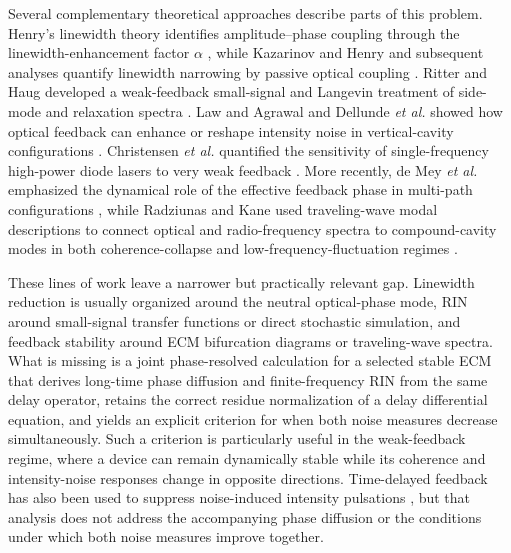 \documentclass{optica-article}
\newif\ifmarked
\newcommand{\rev}[1]{\ifmarked{\color{blue}#1}\else#1\fi}
\begin{document}
Several complementary theoretical approaches describe parts of this problem. Henry's linewidth theory identifies amplitude--phase coupling through the linewidth-enhancement factor $\alpha$ \cite{Henry1982}, while Kazarinov and Henry and subsequent analyses quantify linewidth narrowing by passive optical coupling \cite{KazarinovHenry1987,Tromborg1991,Wenzel2021}. Ritter and Haug developed a weak-feedback small-signal and Langevin treatment of side-mode and relaxation spectra \cite{RitterHaug1993}. Law and Agrawal and Dellunde \emph{et al.} showed how optical feedback can enhance or reshape intensity noise in vertical-cavity configurations \cite{LawAgrawal1998,Dellunde1999}. Christensen \emph{et al.} quantified the sensitivity of single-frequency high-power diode lasers to very weak feedback \cite{Christensen2021}. More recently, de Mey \emph{et al.} emphasized the dynamical role of the effective feedback phase in multi-path configurations \cite{deMey2024}, while Radziunas and Kane used traveling-wave modal descriptions to connect optical and radio-frequency spectra to compound-cavity modes in both coherence-collapse and low-frequency-fluctuation regimes \cite{RadziunasKane2024,RadziunasKane2026}.

These lines of work leave a narrower but practically relevant gap. Linewidth reduction is usually organized around the neutral optical-phase mode, RIN around small-signal transfer functions or direct stochastic simulation, and feedback stability around ECM bifurcation diagrams or traveling-wave spectra. What is missing is a joint phase-resolved calculation for a selected stable ECM that derives long-time phase diffusion and finite-frequency RIN from the same delay operator, retains the correct residue normalization of a delay differential equation, and yields an explicit criterion for when both noise measures decrease simultaneously. Such a criterion is particularly useful in the weak-feedback regime, where a device can remain dynamically stable while its coherence and intensity-noise responses change in opposite directions. \rev{Time-delayed feedback has also been used to suppress noise-induced intensity pulsations \cite{Flunkert2007}, but that analysis does not address the accompanying phase diffusion or the conditions under which both noise measures improve together.}
\end{document}
